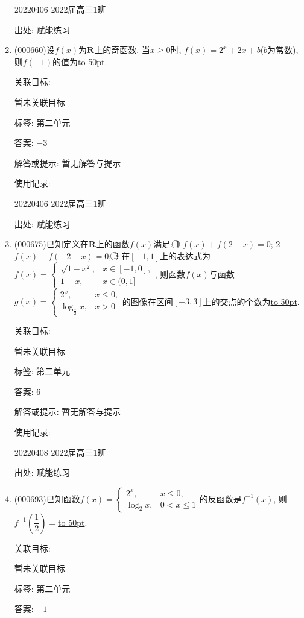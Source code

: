 \documentclass[10pt,a4paper]{article}
\newcommand{\blank}[1]{\underline{\hbox to #1pt{}}}
\begin{document}
\begin{enumerate}[1.]
20220406	2022届高三1班	


出处: 赋能练习
\item { (000660)}设$f(x)$为$\mathbf{R}$上的奇函数. 当$x\ge 0$时, $f(x)=2^x+2x+b$($b$为常数), 则$f(-1)$的值为\blank{50}.


关联目标:

暂未关联目标



标签: 第二单元

答案: $-3$

解答或提示: 暂无解答与提示

使用记录:

20220406	2022届高三1班	


出处: 赋能练习
\item { (000675)}已知定义在$\mathbf{R}$上的函数$f(x)$满足: \textcircled{1} $f(x)+f(2-x)=0$; \textcircled{2} $f(x)-f(-2-x)=0$; \textcircled{3} 在$[-1,1]$上的表达式为$f(x)=\begin{cases} \sqrt{1-x^2}, & x\in [-1,0], \\ 1-x, & x\in (0,1] \end{cases}$, 则函数$f(x)$与函数$g(x)=\begin{cases} 2^x, & x\le 0, \\ \log_{\frac12} x,& x>0 \end{cases}$的图像在区间$[-3,3]$上的交点的个数为\blank{50}.


关联目标:

暂未关联目标



标签: 第二单元

答案: $6$

解答或提示: 暂无解答与提示

使用记录:

20220408	2022届高三1班	


出处: 赋能练习
\item { (000693)}已知函数$f(x)=\begin{cases}2^x, & x\le 0, \\ \log_2 x, & 0<x\le 1\end{cases}$的反函数是$f^{-1}(x)$, 则$f^{-1}(\dfrac12)=$\blank{50}.


关联目标:

暂未关联目标



标签: 第二单元

答案: $-1$


\end{enumerate}
\end{document}

